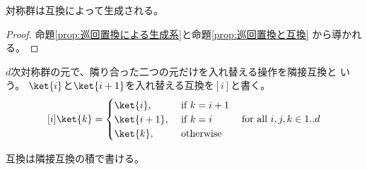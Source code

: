 	\begin{proposition}[互換による生成系]\label{prop:互換による生成系} %
		対称群は互換によって生成される。
	\end{proposition} %
	\begin{proof} %
		命題\ref{prop:巡回置換による生成系}と命題\ref{prop:巡回置換と互換}
		から導かれる。
	\end{proof} %

	\begin{definition}[隣接互換]\label{def:隣接互換} %
		$d$次対称群の元で、隣り合った二つの元だけを入れ替える操作を隣接互換と
		いう。
		$\ket{i}$と$\ket{i+1}$を入れ替える互換を$[i]$と書く。
		\begin{equation*}\begin{split} %
			[i]\ket{k} = \begin{cases} %
				\ket{i}, &\text{ if }k=i+1 \\
				\ket{i+1}, &\text{ if }k=i \\
				\ket{k}, &\text{ otherwise } \\
			\end{cases} %
			\quad\text{for all }i,j,k\in1..d
		\end{split}\end{equation*} %
	\end{definition} %

	互換は隣接互換の積で書ける。

